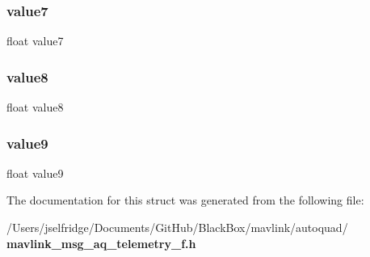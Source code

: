 \subsubsection{value7}
{\footnotesize\ttfamily float value7}

\mbox{\label{struct____mavlink__aq__telemetry__f__t_a590131bf039508bfe299f48a3377ef32}} 
\subsubsection{value8}
{\footnotesize\ttfamily float value8}

\mbox{\label{struct____mavlink__aq__telemetry__f__t_a41d807c0831192b5238bf811f9b2ae59}} 
\subsubsection{value9}
{\footnotesize\ttfamily float value9}



The documentation for this struct was generated from the following file\+:\begin{DoxyCompactItemize}
\item 
/\+Users/jselfridge/\+Documents/\+Git\+Hub/\+Black\+Box/mavlink/autoquad/\textbf{ mavlink\+\_\+msg\+\_\+aq\+\_\+telemetry\+\_\+f.\+h}\end{DoxyCompactItemize}
